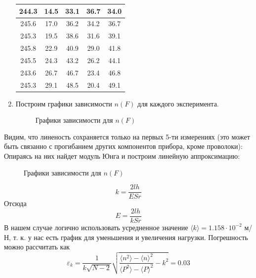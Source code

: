 \documentclass[12pt]{article}
\begin{document}
\begin{enumerate}
\begin{table}[H]
\begin{tabular}{|c|c|c|c|c|}
    244.3          & 14.5   & 33.1                 & 36.7              & 34.0                  \\ \hline
    245.6          & 17.0   & 36.2                 & 34.2              & 36.7                 \\ \hline
    245.3          & 19.5   & 38.6                 & 31.6              & 39.1                 \\ \hline
    245.8          & 22.9   & 40.9                 & 29.0              & 41.8                   \\ \hline
    245.5          & 24.3   & 43.2                 & 26.2              & 44.1                          \\ \hline
    243.6          & 26.7   & 46.7                 & 23.4              & 46.8                             \\ \hline
    245.3          & 29.1   & 48.5                 & 20.4              & 49.1                            \\ \hline
    \end{tabular}
    \end{table}
    \item Построим графики зависимости $n(F)$ для каждого эксперимента.
    \begin{figure}[H]
        \centering
        \caption{Графики зависимости для $n(F)$}
        
    \end{figure}
    \end{enumerate}
    Видим, что линеность сохраняется только на первых 5-ти измерениях (это может быть связанно с прогибанием других компонентов прибора, кроме проволоки):
    \newline Опираясь на них найдет модуль Юнга и построим линейную аппроксимацию:
    \begin{figure}[H]
        \centering
        \caption{Графики зависимости для $n(F)$}
        
    \end{figure}
    \begin{equation}
        k = \frac{2lh}{ESr}
    \end{equation}
    Отсюда
    \begin{equation}
        E =\frac{2lh}{kSr}
    \end{equation}
    В нашем случае логично использовать усредненное значение $\langle k \rangle = 1.158 \cdot
    10^{-2}
    $ м/Н, т. к. у нас есть график для уменьшения и увеличения нагрузки.
    Погрешность можно рассчитать как
    \[ \varepsilon_k = \frac{1}{k\sqrt{N - 2}}\sqrt{\frac{\langle n^2 \rangle -\langle n \rangle^2}{
    \langle P^2 \rangle - \langle P \rangle^2} - k^2} = 0.03\]
\end{document}
